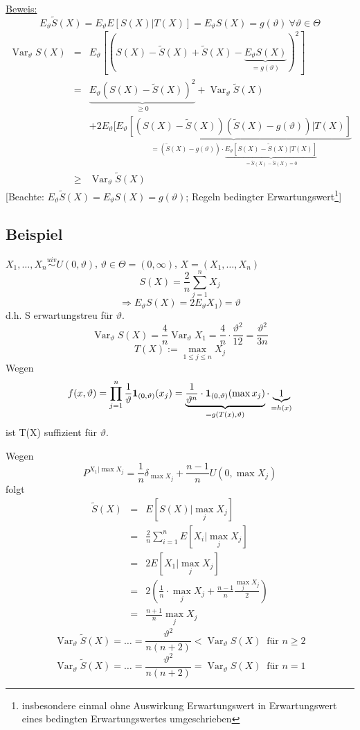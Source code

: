 \documentclass[a4paper,11pt,twoside,titlepage]{article}
\newcommand{\ind}{\text{\bf{1}}} %
\newcommand{\uiv}{\ensuremath{\stackrel{uiv}{\sim}}}
\DeclareMathOperator{\var}{Var}
\begin{document}
\underline{Beweis:}
\[E_\vartheta \tilde S(X)=E_\vartheta E[S(X)|T(X)]=E_\vartheta S(X)=g(\vartheta)\ \forall\vartheta\in\Theta\]
\begin{eqnarray*}
\var_\vartheta S(X)&=&E_\vartheta[(S(X)-\tilde S(X)+\tilde S(X)-\underbrace{E_\vartheta S(X)}_{=g(\vartheta)})^2]\\
&=&\underbrace{E_\vartheta(S(X)-\tilde S(X))^2}_{\geq 0}+\var_\vartheta\tilde S(X)\\&&+2E_\vartheta[\underbrace{E_\vartheta[(S(X)-\tilde S(X))(\tilde S(X)-g(\vartheta))|T(X)]}_{=(\tilde S(X)-g(\vartheta))\cdot \underbrace{E_\vartheta[S(X)-\tilde S(X)|T(X)]}_{=\tilde S(X)-\tilde S(X)=0}}\\
&\geq&\var_\vartheta\tilde S(X)\end{eqnarray*}
[Beachte: $E_\vartheta \tilde S(X)=E_\vartheta S(X)=g(\vartheta)$; Regeln bedingter Erwartungswert\footnote{insbesondere einmal ohne Auswirkung Erwartungswert in Erwartungswert eines bedingten Erwartungswertes umgeschrieben}]

\subsection{Beispiel}
$X_1,\ldots,X_n\uiv U(0,\vartheta)$, $\vartheta\in\Theta=(0,\infty)$, $X=(X_1,\ldots,X_n)$
\[S(X)=\frac2n \sum_{j=1}^n X_j\]
\[\Rightarrow E_\vartheta S(X)=2E_\vartheta X_1)=\vartheta\]
d.h. S erwartungstreu für $\vartheta$.
\[\var_\vartheta S(X)=\frac4n\var_\vartheta X_1=\frac4n\cdot \frac{\vartheta^2}{12}=\frac{\vartheta^2}{3n}\]
\[T(X):=\max_{1\leq j\leq n}X_j\]
Wegen
\[f(x,\vartheta)=\prod_{j=1}^n\frac{1}{\vartheta}\ind_{(0,\vartheta)}(x_j)=\underbrace{\frac{1}{\vartheta^n}\cdot\ind_{(0,\vartheta)}(\max x_j)}_{=g(T(x),\vartheta)}\cdot \underbrace{1}_{=h(x)}\]
ist T(X) suffizient für $\vartheta$.

Wegen
\[P^{X_1|\max X_j}=\frac 1n\delta_{\max X_j}+\frac{n-1}{n}U(0,\max X_j)\]
folgt
\begin{eqnarray*}
\tilde S(X)&=&E[S(X)|\max_j X_j]\\
&=&\frac2n \sum_{i=1}^nE[X_i|\max_j X_j]\\
&=&2E[X_1|\max_j X_j]\\
&=&2(\frac 1n\cdot \max_j X_j+\frac{n-1}{n} \frac{\max_j X_j}{2})\\
&=&\frac{n+1}{n}\max_j X_j\end{eqnarray*}
\[\var_\vartheta \tilde S(X)=\ldots=\frac{\vartheta^2}{n(n+2)}<\var_\vartheta S(X)\ \mbox{ für }n\geq 2\]
\[\var_\vartheta \tilde S(X)=\ldots=\frac{\vartheta^2}{n(n+2)}=\var_\vartheta S(X)\ \mbox{ für }n = 1\]
\end{document}
